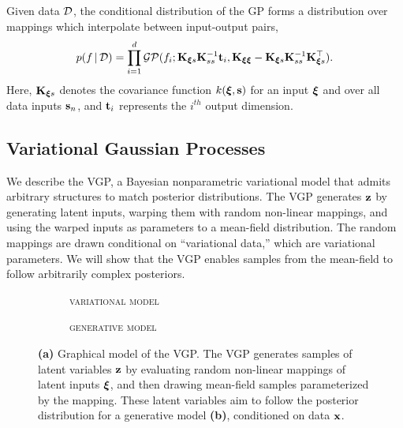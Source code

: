 Given data $\mathcal{D}$, the conditional distribution of the \gls{GP} forms a
distribution over mappings which interpolate between input-output
pairs,
\begin{equation}
  p(f \,|\, \mathcal{D}) = \prod_{i=1}^d \mathcal{GP}(f_i; \mathbf{K}_{\boldsymbol{\mathbf{\xi}} s} \mathbf{K}_{ss}^{-1} \mathbf{t}_i, \mathbf{K}_{\boldsymbol{\mathbf{\xi}}\boldsymbol{\mathbf{\xi}}} -
  \mathbf{K}_{\boldsymbol{\mathbf{\xi}} s} \mathbf{K}_{ss}^{-1} \mathbf{K}_{\boldsymbol{\mathbf{\xi}} s}^\top).
  \label{eq:gp_posterior}
\end{equation}
Here, $\mathbf{K}_{\boldsymbol{\mathbf{\xi}} s}$ denotes the covariance function $k(\boldsymbol{\mathbf{\xi}}, \mathbf{s})$ for an
input $\boldsymbol{\mathbf{\xi}}$ and over all data inputs $\mathbf{s}_n$, and $\mathbf{t}_i$
represents the $i^{th}$ output dimension.

\subsection{Variational Gaussian Processes}
\label{sec:vgp}

We describe the \acrfull{VGP}, a Bayesian nonparametric variational
model that admits arbitrary structures to match posterior
distributions. The \gls{VGP} generates $\boldsymbol{\mathbf{z}}$ by generating latent
inputs, warping them with random non-linear mappings, and using the
warped inputs as parameters to a mean-field distribution.  The random
mappings are drawn conditional on ``variational data,'' which are
variational parameters. We will show that the
\gls{VGP} enables samples from the mean-field to follow arbitrarily
complex posteriors.

\begin{figure}[tb]
\begin{subfigure}[t]{0.5\columnwidth}
  \centering
  
  \vspace{1ex}
  \caption{\textsc{variational model}}
  \label{sub:vgp}
\end{subfigure}
\begin{subfigure}[t]{0.5\columnwidth}
  \centering
  
  \vspace{1ex}
  \caption{\textsc{generative model}}
  \label{sub:black_box}
\end{subfigure}
\caption{\textbf{(a)} Graphical model of the \acrlong{VGP}.
The \gls{VGP} generates samples of latent variables $\boldsymbol{\mathbf{z}}$ by
evaluating random non-linear mappings of latent inputs $\boldsymbol{\mathbf{\xi}}$, and
then drawing mean-field samples parameterized by the mapping.  These
latent variables aim to follow the posterior distribution for a
generative model \textbf{(b)}, conditioned on data $\boldsymbol{\mathbf{x}}$.
}
\label{fig:vgp}
\end{figure}



